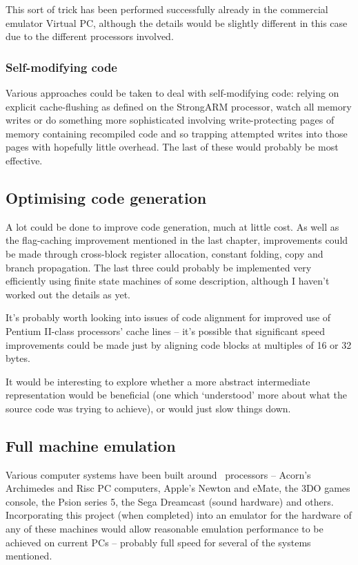 This sort of trick has been performed successfully already in the commercial emulator Virtual PC, although the details would be slightly different in this case due to the different processors involved.

\subsubsection{Self-modifying code}

Various approaches could be taken to deal with self-modifying code: relying on explicit cache-flushing as defined on the StrongARM processor, watch all memory writes or do something more sophisticated involving write-protecting pages of memory containing recompiled code and so trapping attempted writes into those pages with hopefully little overhead. The last of these would probably be most effective.

\subsection{Optimising code generation}

A lot could be done to improve code generation, much at little cost. As well as the flag-caching improvement mentioned in the last chapter, improvements could be made through cross-block register allocation, constant folding, copy and branch propagation. The last three could probably be implemented very efficiently using finite state machines of some description, although I haven't worked out the details as yet.

It's probably worth looking into issues of code alignment for improved use of Pentium II-class processors' cache lines -- it's possible that significant speed improvements could be made just by aligning code blocks at multiples of 16 or 32 bytes.

It would be interesting to explore whether a more abstract intermediate representation would be beneficial (one which `understood' more about what the source code was trying to achieve), or would just slow things down.

\subsection{Full machine emulation}

Various computer systems have been built around \arm\ processors -- Acorn's Archimedes and Risc PC computers, Apple's Newton and eMate, the 3DO games console, the Psion series 5, the Sega Dreamcast (sound hardware) and others. Incorporating this project (when completed) into an emulator for the hardware of any of these machines would allow reasonable emulation performance to be achieved on current PCs -- probably full speed for several of the systems mentioned.

